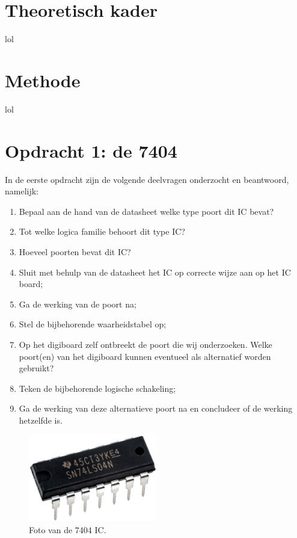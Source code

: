 \documentclass[12pt]{article}
\begin{document}
\section{Theoretisch kader}
lol

\pagebreak
\section{Methode}
lol

\pagebreak
\section{Opdracht 1: de 7404}
In de eerste opdracht zijn de volgende deelvragen onderzocht en beantwoord, namelijk:
\begin{enumerate}
    \item Bepaal aan de hand van de datasheet welke type poort dit IC bevat?
    \item Tot welke logica familie behoort dit type IC?
    \item Hoeveel poorten bevat dit IC?
    \item Sluit met behulp van de datasheet het IC op correcte wijze aan op het IC board;
    \item Ga de werking van de poort na;
    \item Stel de bijbehorende waarheidstabel op;
    \item Op het digiboard zelf ontbreekt de poort die wij onderzoeken. Welke poort(en) van het digiboard kunnen eventueel als alternatief worden gebruikt?
    \item Teken de bijbehorende logische schakeling;
    \item Ga de werking van deze alternatieve poort na en concludeer of de werking hetzelfde is. 
\end{enumerate} 

\begin{figure}[h]
    \centering
    \includegraphics[width=0.5\textwidth]{7404_PLAATJE.png}
    \caption{Foto van de 7404 IC.}
    \label{fig:7404}
\end{figure}
\end{document}
